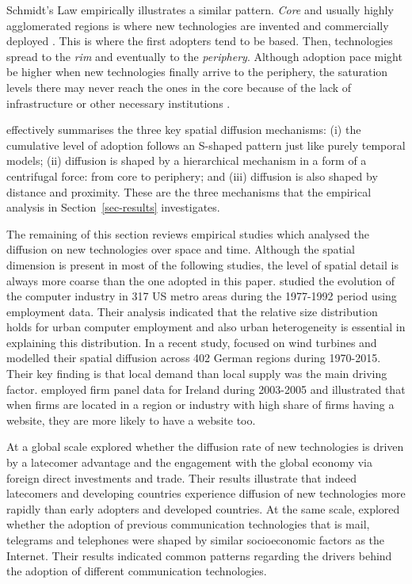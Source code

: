 \documentclass[
  authoryear,
  preprint,
  3p]{elsarticle}
\begin{document}
Schmidt's Law empirically illustrates a similar pattern. \emph{Core} and
usually highly agglomerated regions is where new technologies are
invented and commercially deployed \citep{grubler1990rise}. This is
where the first adopters tend to be based. Then, technologies spread to
the \emph{rim} and eventually to the \emph{periphery}. Although adoption
pace might be higher when new technologies finally arrive to the
periphery, the saturation levels there may never reach the ones in the
core because of the lack of infrastructure or other necessary
institutions \citep{leibowicz2016representing}.

\citet{grubler1990rise} effectively summarises the three key spatial
diffusion mechanisms: (i) the cumulative level of adoption follows an
S-shaped pattern just like purely temporal models; (ii) diffusion is
shaped by a hierarchical mechanism in a form of a centrifugal force:
from core to periphery; and (iii) diffusion is also shaped by distance
and proximity. These are the three mechanisms that the empirical
analysis in Section~\ref{sec-results} investigates.

The remaining of this section reviews empirical studies which analysed
the diffusion on new technologies over space and time. Although the
spatial dimension is present in most of the following studies, the level
of spatial detail is always more coarse than the one adopted in this
paper. \citet{beardsell1999spatial} studied the evolution of the
computer industry in 317 US metro areas during the 1977-1992 period
using employment data. Their analysis indicated that the relative size
distribution holds for urban computer employment and also urban
heterogeneity is essential in explaining this distribution. In a recent
study, \citet{bednarz2020pulled} focused on wind turbines and modelled
their spatial diffusion across 402 German regions during 1970-2015.
Their key finding is that local demand than local supply was the main
driving factor. \citet{haller2011determinants} employed firm panel data
for Ireland during 2003-2005 and illustrated that when firms are located
in a region or industry with high share of firms having a website, they
are more likely to have a website too.

At a global scale \citet{perkins2005international} explored whether the
diffusion rate of new technologies is driven by a latecomer advantage
and the engagement with the global economy via foreign direct
investments and trade. Their results illustrate that indeed latecomers
and developing countries experience diffusion of new technologies more
rapidly than early adopters and developed countries. At the same scale,
\citet{perkins2011internet} explored whether the adoption of previous
communication technologies that is mail, telegrams and telephones were
shaped by similar socioeconomic factors as the Internet. Their results
indicated common patterns regarding the drivers behind the adoption of
different communication technologies.
\end{document}
